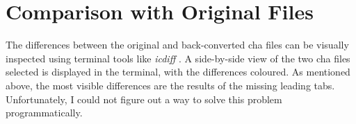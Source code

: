 \section{Comparison with Original Files}
The differences between the original and back-converted cha files can be visually inspected using terminal tools like \emph{icdiff} . A side-by-side view of the two cha files selected is displayed in the terminal, with the differences coloured. As mentioned above, the most visible differences are the results of the missing leading tabs. Unfortunately, I could not figure out a way to solve this problem programmatically.
